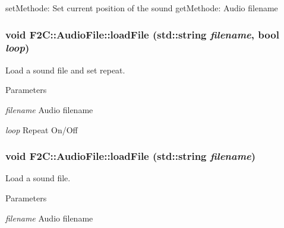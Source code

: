setMethode: Set current position of the sound getMethode: Audio filename \hypertarget{class_f2_c_1_1_audio_file_a4c9c159b5e53f48d5c11e583eabebf3c}{
\subsubsection[{loadFile}]{\setlength{\rightskip}{0pt plus 5cm}void F2C::AudioFile::loadFile (std::string {\em filename}, \/  bool {\em loop})}}
\label{class_f2_c_1_1_audio_file_a4c9c159b5e53f48d5c11e583eabebf3c}


Load a sound file and set repeat. 
\begin{DoxyParams}{Parameters}
\item[{\em filename}]Audio filename \item[{\em loop}]Repeat On/Off \end{DoxyParams}
\hypertarget{class_f2_c_1_1_audio_file_af30d1dfd6c5f6d1fbfef9749dcab4122}{
\subsubsection[{loadFile}]{\setlength{\rightskip}{0pt plus 5cm}void F2C::AudioFile::loadFile (std::string {\em filename})}}
\label{class_f2_c_1_1_audio_file_af30d1dfd6c5f6d1fbfef9749dcab4122}


Load a sound file. 
\begin{DoxyParams}{Parameters}
\item[{\em filename}]Audio filename \end{DoxyParams}

